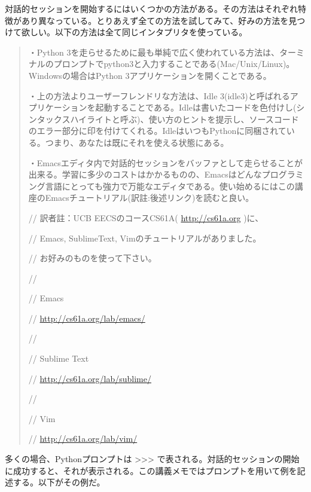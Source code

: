 \documentclass[letterpaper,10pt,dvipdfmx]{sphinxmanual}
\begin{document}
対話的セッションを開始するにはいくつかの方法がある。その方法はそれぞれ特徴があり異なっている。とりあえず全ての方法を試してみて、好みの方法を見つけて欲しい。以下の方法は全て同じインタプリタを使っている。
\begin{quote}

・Python 3を走らせるために最も単純で広く使われている方法は、ターミナルのプロンプトでpython3と入力することである(Mac/Unix/Linux)。Windowsの場合はPython 3アプリケーションを開くことである。

・上の方法よりユーザーフレンドリな方法は、Idle 3(idle3)と呼ばれるアプリケーションを起動することである。Idleは書いたコードを色付けし(シンタックスハイライトと呼ぶ)、使い方のヒントを提示し、ソースコードのエラー部分に印を付けてくれる。IdleはいつもPythonに同梱されている。つまり、あなたは既にそれを使える状態にある。

・Emacsエディタ内で対話的セッションをバッファとして走らせることが出来る。学習に多少のコストはかかるものの、Emacsはどんなプログラミング言語にとっても強力で万能なエディタである。使い始めるにはこの講座のEmacsチュートリアル(訳註:後述リンク)を読むと良い。

\begin{DUlineblock}{0em}
\item[] // 訳者註：UCB EECSのコースCS61A( \href{http://cs61a.org}{http://cs61a.org} )に、
\item[] // Emacs, SublimeText, Vimのチュートリアルがありました。
\item[] // お好みのものを使って下さい。
\item[] //
\item[] // Emacs
\item[] // \href{http://cs61a.org/lab/emacs/}{http://cs61a.org/lab/emacs/}
\item[] //
\item[] // Sublime Text
\item[] // \href{http://cs61a.org/lab/sublime/}{http://cs61a.org/lab/sublime/}
\item[] //
\item[] // Vim
\item[] // \href{http://cs61a.org/lab/vim/}{http://cs61a.org/lab/vim/}
\end{DUlineblock}
\end{quote}

多くの場合、Pythonプロンプトは \textgreater{}\textgreater{}\textgreater{} で表される。対話的セッションの開始に成功すると、それが表示される。この講義メモではプロンプトを用いて例を記述する。以下がその例だ。
\end{document}
